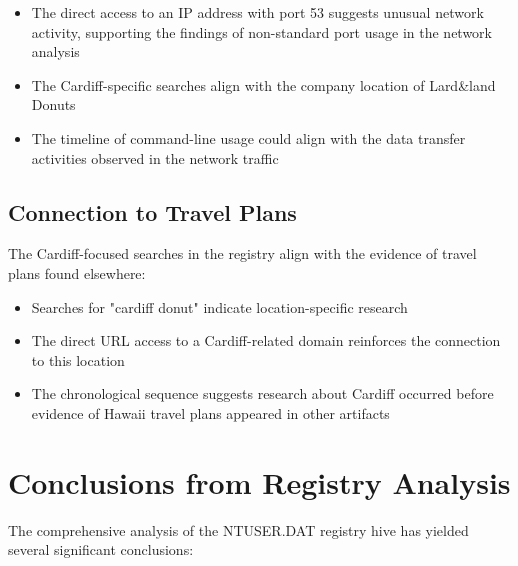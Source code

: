 \begin{itemize}
    \item The direct access to an IP address with port 53 suggests unusual network activity, supporting the findings of non-standard port usage in the network analysis
    \item The Cardiff-specific searches align with the company location of Lard\&land Donuts
    \item The timeline of command-line usage could align with the data transfer activities observed in the network traffic
\end{itemize}

\subsection{Connection to Travel Plans}
The Cardiff-focused searches in the registry align with the evidence of travel plans found elsewhere:

\begin{itemize}
    \item Searches for "cardiff donut" indicate location-specific research
    \item The direct URL access to a Cardiff-related domain reinforces the connection to this location
    \item The chronological sequence suggests research about Cardiff occurred before evidence of Hawaii travel plans appeared in other artifacts
\end{itemize}

\section{Conclusions from Registry Analysis}
The comprehensive analysis of the NTUSER.DAT registry hive has yielded several significant conclusions:

